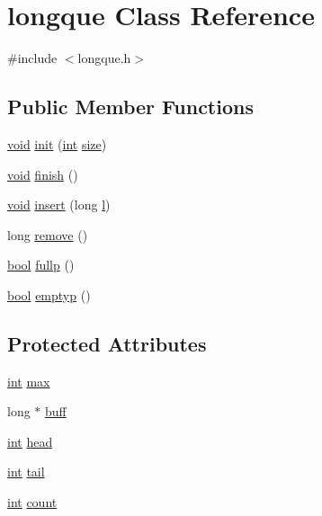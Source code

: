 \hypertarget{classlongque}{}\section{longque Class Reference}
\label{classlongque}


{\ttfamily \#include $<$longque.\+h$>$}

\subsection*{Public Member Functions}
\begin{DoxyCompactItemize}
\item 
\hyperlink{sound_8c_ae35f5844602719cf66324f4de2a658b3}{void} \hyperlink{classlongque_a9171419dc0463502c5f3d616c1247976}{init} (\hyperlink{xmltok_8h_a5a0d4a5641ce434f1d23533f2b2e6653}{int} \hyperlink{group__lavu__mem_ga854352f53b148adc24983a58a1866d66}{size})
\item 
\hyperlink{sound_8c_ae35f5844602719cf66324f4de2a658b3}{void} \hyperlink{classlongque_add511638719f8f141166dbe029605f46}{finish} ()
\item 
\hyperlink{sound_8c_ae35f5844602719cf66324f4de2a658b3}{void} \hyperlink{classlongque_a9d12784d78257a3e154656b65b398b64}{insert} (long \hyperlink{layer3_8c_a741dbb4d8e78c3cb69915db7282fcec0}{l})
\item 
long \hyperlink{classlongque_a51da6dad37cf235335a458ff5f8e41d9}{remove} ()
\item 
\hyperlink{mac_2config_2i386_2lib-src_2libsoxr_2soxr-config_8h_abb452686968e48b67397da5f97445f5b}{bool} \hyperlink{classlongque_ad61dc046ffa38b51648513f71a61d8fd}{fullp} ()
\item 
\hyperlink{mac_2config_2i386_2lib-src_2libsoxr_2soxr-config_8h_abb452686968e48b67397da5f97445f5b}{bool} \hyperlink{classlongque_a4002ec284d10347581204ac48907c71e}{emptyp} ()
\end{DoxyCompactItemize}
\subsection*{Protected Attributes}
\begin{DoxyCompactItemize}
\item 
\hyperlink{xmltok_8h_a5a0d4a5641ce434f1d23533f2b2e6653}{int} \hyperlink{classlongque_a1d7037efad55734a7e61b532576d7ccd}{max}
\item 
long $\ast$ \hyperlink{classlongque_aa9ecb512dcdc30942ff697db30cad4b9}{buff}
\item 
\hyperlink{xmltok_8h_a5a0d4a5641ce434f1d23533f2b2e6653}{int} \hyperlink{classlongque_abbf58acc2166bf48a13bdf4e4149d4ea}{head}
\item 
\hyperlink{xmltok_8h_a5a0d4a5641ce434f1d23533f2b2e6653}{int} \hyperlink{classlongque_a766b1fa9835660ed70e7377cfa9f3209}{tail}
\item 
\hyperlink{xmltok_8h_a5a0d4a5641ce434f1d23533f2b2e6653}{int} \hyperlink{classlongque_a2c61162e0f12c1db5e7e8a9fad0859c9}{count}
\end{DoxyCompactItemize}


